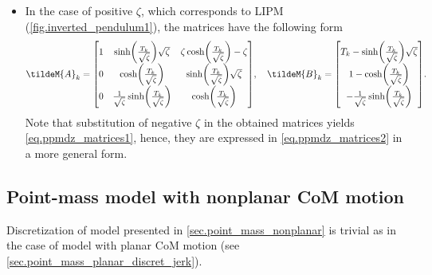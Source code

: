 \begin{itemize}
    \item In the case of positive $\zeta$, which corresponds to \ac{LIPM}
        (\cref{fig.inverted_pendulum1}), the matrices have the following form
        \begin{equation}
            \label{eq.ppmdz_matrices2}
            \tildeM{A}_k
            =
            \begin{bmatrix}
                1   &   \sinh \left(\frac{T_k}{\sqrt{\zeta}}\right) \sqrt{\zeta} &   \zeta\cosh \left(\frac{T_k}{\sqrt{\zeta}}\right) - \zeta \\
                0   &   \cosh \left(\frac{T_k}{\sqrt{\zeta}}\right)  &   \sinh \left(\frac{T_k}{\sqrt{\zeta}}\right) \sqrt{\zeta} \\
                0   &   \frac{1}{\sqrt{\zeta}}\sinh \left(\frac{T_k}{\sqrt{\zeta}}\right)     &   \cosh \left(\frac{T_k}{\sqrt{\zeta}}\right)\\
            \end{bmatrix}
            ,
            \quad
            \tildeM{B}_k
            =
            \begin{bmatrix}
                T_k - \sinh \left(\frac{T_k}{\sqrt{\zeta}}\right) \sqrt{\zeta} \\
                1 - \cosh \left(\frac{T_k}{\sqrt{\zeta}}\right) \\
                - \frac{1}{\sqrt{\zeta}} \sinh \left(\frac{T_k}{\sqrt{\zeta}}\right)
            \end{bmatrix}
            .
        \end{equation}
        Note that substitution of negative $\zeta$ in the obtained matrices
        yields \cref{eq.ppmdz_matrices1}, hence, they are expressed in
        \cref{eq.ppmdz_matrices2} in a more general form.
\end{itemize}
%




\subsection{Point-mass model with nonplanar CoM motion}

Discretization of  model presented in
\cref{sec.point_mass_nonplanar} is trivial as in the case of
 model with planar \ac{CoM} motion (see
\cref{sec.point_mass_planar_discret_jerk}).



